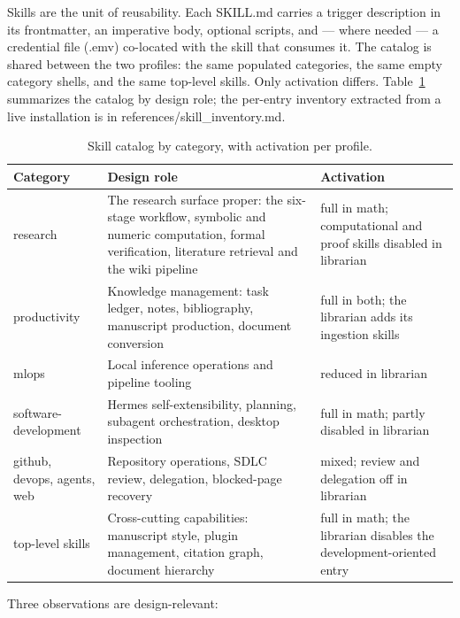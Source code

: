 \documentclass[10pt]{article}
\newcommand{\mono}[1]{{\ttfamily\small #1}}
\begin{document}
Skills are the unit of reusability. Each \mono{SKILL.md} carries a trigger description in its
frontmatter, an imperative body, optional scripts, and --- where needed --- a credential file
(\mono{.emv}) co-located with the skill that consumes it. The catalog is shared
between the two profiles: the same populated categories, the same empty category shells, and the
same top-level skills. Only activation differs. Table~\ref{tab:skillcats}
summarizes the catalog by design role; the per-entry inventory extracted from a live installation is
in \mono{references/skill\_inventory.md}.

\begin{table}[H]
\centering\small
\caption{Skill catalog by category, with activation per profile.}
\label{tab:skillcats}
\renewcommand{\arraystretch}{1.2}
\begin{tabularx}{\textwidth}{@{}>{\raggedright\arraybackslash}p{3.1cm} X >{\raggedright\arraybackslash}p{3.1cm}@{}}
\toprule
\textbf{Category} & \textbf{Design role} & \textbf{Activation} \\
\midrule
research & The research surface proper: the six-stage workflow, symbolic and numeric computation, formal verification, literature retrieval and the wiki pipeline & full in math; computational and proof skills disabled in librarian \\
productivity & Knowledge management: task ledger, notes, bibliography, manuscript production, document conversion & full in both; the librarian adds its ingestion skills \\
mlops & Local inference operations and pipeline tooling & reduced in librarian \\
software-development & Hermes self-extensibility, planning, subagent orchestration, desktop inspection & full in math; partly disabled in librarian \\
github, devops, agents, web & Repository operations, SDLC review, delegation, blocked-page recovery & mixed; review and delegation off in librarian \\
top-level skills & Cross-cutting capabilities: manuscript style, plugin management, citation graph, document hierarchy & full in math; the librarian disables the development-oriented entry \\
\bottomrule
\end{tabularx}
\end{table}

Three observations are design-relevant:
\end{document}
